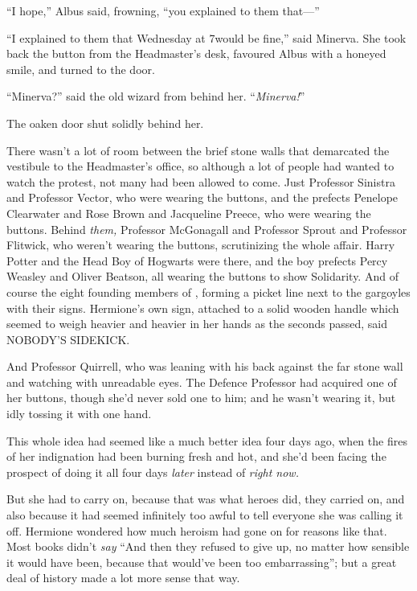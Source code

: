 “I hope,” Albus said, frowning, “you explained to them that—”

“I explained to them that Wednesday at 7\PM would be fine,” said Minerva. She took back the button from the Headmaster’s desk, favoured Albus with a honeyed smile, and turned to the door.

“Minerva?” said the old wizard from behind her. “\emph{Minerva!}”

The oaken door shut solidly behind her.

\later

There wasn’t a lot of room between the brief stone walls that demarcated the vestibule to the Headmaster’s office, so although a lot of people had wanted to watch the protest, not many had been allowed to come. Just Professor Sinistra and Professor Vector, who were wearing the buttons, and the prefects Penelope Clearwater and Rose Brown and Jacqueline Preece, who were wearing the buttons. Behind \emph{them,} Professor McGonagall and Professor Sprout and Professor Flitwick, who weren’t wearing the buttons, scrutinizing the whole affair. Harry Potter and the Head Boy of Hogwarts were there, and the boy prefects Percy Weasley and Oliver Beatson, all wearing the buttons to show Solidarity. And of course the eight founding members of \SPHEW, forming a picket line next to the gargoyles with their signs. Hermione’s own sign, attached to a solid wooden handle which seemed to weigh heavier and heavier in her hands as the seconds passed, said NOBODY’S SIDEKICK.

And Professor Quirrell, who was leaning with his back against the far stone wall and watching with unreadable eyes. The Defence Professor had acquired one of her buttons, though she’d never sold one to him; and he wasn’t wearing it, but idly tossing it with one hand.

This whole idea had seemed like a much better idea four days ago, when the fires of her indignation had been burning fresh and hot, and she’d been facing the prospect of doing it all four days \emph{later} instead of \emph{right now.}

But she had to carry on, because that was what heroes did, they carried on, and also because it had seemed infinitely too awful to tell everyone she was calling it off. Hermione wondered how much heroism had gone on for reasons like that. Most books didn’t \emph{say} “And then they refused to give up, no matter how sensible it would have been, because that would’ve been too embarrassing”; but a great deal of history made a lot more sense that way.

